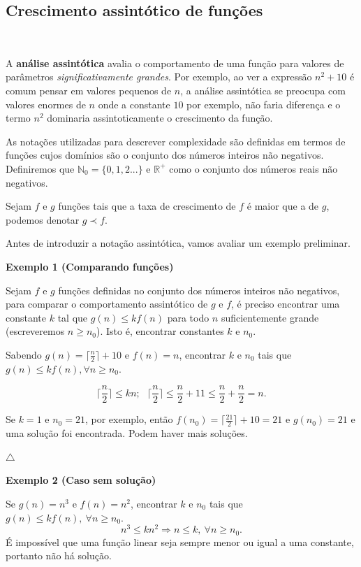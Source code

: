 \subsection{Crescimento assintótico de funções}
\

A \textbf{análise assintótica} avalia o comportamento de uma função para valores de parâmetros \textit{significativamente grandes}. Por exemplo, ao ver a expressão $n^2+10$ é comum pensar em valores pequenos de $n$, a análise assintótica se preocupa com valores enormes de $n$ onde a constante $10$ por exemplo, não faria diferença e o termo $n^2$ dominaria assintoticamente o crescimento da função.

As notações utilizadas para descrever complexidade são definidas em termos de funções cujos domínios são o conjunto dos números inteiros não negativos. Definiremos que $\mathbb{N}_0 = \{0,1,2...\}$ e $\mathbb{R}^{+}$ como o conjunto dos números reais não negativos.

Sejam $f$ e $g$ funções tais que a taxa de crescimento de $f$ é maior que a de $g$, podemos denotar $g\prec f$.

Antes de introduzir a notação assintótica, vamos avaliar um exemplo preliminar.

\textbf{Exemplo 1 (Comparando funções)}

Sejam $f$ e $g$ funções definidas no conjunto dos números inteiros não negativos, para comparar o comportamento assintótico de $g$ e $f$, é preciso encontrar uma constante $k$ tal que $g(n)\leq kf(n)$ para todo $n$ suficientemente grande (escreveremos $n\geq n_0$). Isto é, encontrar constantes $k$ e $n_0$.

Sabendo $g(n)=\lceil\frac{n}{2}\rceil+10$ e $f(n)=n$, encontrar $k$ e $n_0$ tais que $g(n)\leq kf(n), \forall n\geq n_0$.

\[\Bigr\lceil \frac{n}{2} \Bigr\rceil \leq kn; \ \ \ \Bigr\lceil \frac{n}{2} \Bigr\rceil \leq \frac{n}{2} + 11 \leq \frac{n}{2} + \frac{n}{2} = n.\]

Se $k=1$ e $n_0=21$, por exemplo, então $f(n_0)=\lceil\frac{21}{2}\rceil+10 = 21$ e $g(n_0)=21$ e uma solução foi encontrada. Podem haver mais soluções.

{\raggedleft $\bigtriangleup$ \par}

\textbf{Exemplo 2 (Caso sem solução)}

Se $g(n)=n^3$ e $f(n)=n^2$, encontrar $k$ e $n_0$ tais que $g(n)\leq kf(n), \ \forall n\geq n_0$.
\[n^3\leq kn^2 \Rightarrow n\leq k, \ \forall n\geq n_0. \]
É impossível que uma função linear seja sempre menor ou igual a uma constante, portanto não há solução.

